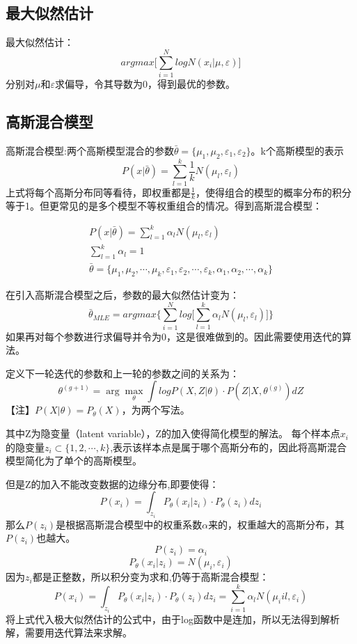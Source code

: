 \documentclass[UTF8]{ctexart} %
\begin{document}
		\subsection{最大似然估计}
		最大似然估计：
		\[argmax\Big[\sum_{i=1}^NlogN(x_i|\mu,\varepsilon)\Big]\]
		分别对$\mu$和$\varepsilon$求偏导，令其导数为0，得到最优的参数。
		
		\subsection{高斯混合模型}
		高斯混合模型:两个高斯模型混合的参数$\bar{\theta}=\{\mu_1,\mu_2,\varepsilon_1,\varepsilon_2\}$。k个高斯模型的表示
		\[P(x|\bar{\theta}) = \sum_{l=1}^k\frac{1}{k}N(\mu_l,\varepsilon_l)\]
		上式将每个高斯分布同等看待，即权重都是$\frac{1}{k}$，使得组合的模型的概率分布的积分等于1。但更常见的是多个模型不等权重组合的情况。得到高斯混合模型：
		
		\begin{gather}
		P(x|\bar{\theta}) = \sum_{l=1}^k\alpha_lN(\mu_l,\varepsilon_l)\\
		\sum_{l=1}^k\alpha_l=1\\
		\bar{\theta}=\{\mu_1,\mu_2,\cdots,\mu_k,\varepsilon_1,\varepsilon_2,\cdots,\varepsilon_k,\alpha_1,\alpha_2,\cdots,\alpha_k\}
		\end{gather}
		
		在引入高斯混合模型之后，参数的最大似然估计变为：
		\[\bar{\theta}_{MLE} = argmax\Big\{\sum_{i=1}^Nlog\big[\sum_{l=1}^k\alpha_lN(\mu_l,\varepsilon_l)\big]\Big\}\]
		如果再对每个参数进行求偏导并令为0，这是很难做到的。因此需要使用迭代的算法。
		
		定义下一轮迭代的参数和上一轮的参数之间的关系为：
		\[\theta^{(g+1)} = \arg\max_{\theta}\int logP(X,Z|\theta)\cdot P(Z|X,\theta^{(g)})dZ\]
		【注】$P(X|\theta) = P_{\theta}(X)$，为两个写法。
		 
		其中Z为隐变量（latent variable），Z的加入使得简化模型的解法。
		每个样本点$x_i$的隐变量$z_i\subset \{1,2,\cdots ,k\}$,表示该样本点是属于哪个高斯分布的，因此将高斯混合模型简化为了单个的高斯模型。
		
		但是Z的加入不能改变数据的边缘分布,即要使得：
		\[P(x_i) = \int_{z_i}P_\theta(x_i|z_i)\cdot P_\theta(z_i)dz_i\]
		那么$P(z_i)$是根据高斯混合模型中的权重系数$\alpha$来的，权重越大的高斯分布，其$P(z_i)$也越大。
		\[P(z_i) = \alpha_i\]
		\[P_\theta(x_i|z_i) = N(\mu_i,\varepsilon_i)\]
		因为$z_i$都是正整数，所以积分变为求和,仍等于高斯混合模型：
		\[P(x_i) = \int_{z_i}P_\theta(x_i|z_i)\cdot P_\theta(z_i)dz_i = \sum_{i=1}^k\alpha_lN(\mu_iil,\varepsilon_i)\]
			将上式代入极大似然估计的公式中，由于log函数中是连加，所以无法得到解析解，需要用迭代算法来求解。
\end{document}
